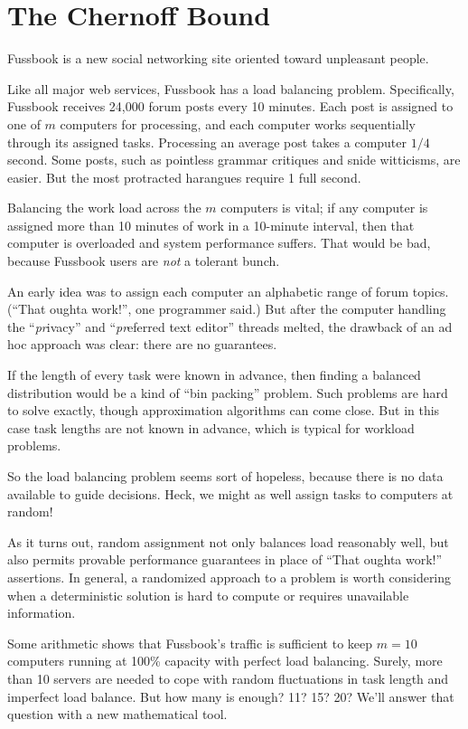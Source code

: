 \chapter{The Chernoff Bound}

Fussbook is a new social networking site oriented toward unpleasant
people.

Like all major web services, Fussbook has a load balancing problem.
Specifically, Fussbook receives 24,000 forum posts every 10 minutes.
Each post is assigned to one of $m$ computers for processing, and each
computer works sequentially through its assigned tasks.  Processing an
average post takes a computer $1/4$ second.  Some posts, such as
pointless grammar critiques and snide witticisms, are easier.  But the
most protracted harangues require 1 full second.

Balancing the work load across the $m$ computers is vital; if any
computer is assigned more than 10 minutes of work in a 10-minute
interval, then that computer is overloaded and system performance
suffers.  That would be bad, because Fussbook users are {\em not} a
tolerant bunch.

An early idea was to assign each computer an alphabetic range of forum
topics.  (``That oughta work!'', one programmer said.)  But after the
computer handling the ``{\em pr}ivacy'' and ``{\em pr}eferred text
editor'' threads melted, the drawback of an ad hoc approach was clear:
there are no guarantees.

If the length of every task were known in advance, then finding a
balanced distribution would be a kind of ``bin packing'' problem.
Such problems are hard to solve exactly, though approximation
algorithms can come close.  But in this case task lengths are not
known in advance, which is typical for workload problems.

So the load balancing problem seems sort of hopeless, because there is
no data available to guide decisions.  Heck, we might as well assign
tasks to computers at random!

As it turns out, random assignment not only balances load reasonably
well, but also permits provable performance guarantees in place of
``That oughta work!''  assertions.  In general, a randomized approach
to a problem is worth considering when a deterministic solution is
hard to compute or requires unavailable information.

Some arithmetic shows that Fussbook's traffic is sufficient to keep $m
= 10$ computers running at 100\% capacity with perfect load balancing.
Surely, more than 10 servers are needed to cope with random
fluctuations in task length and imperfect load balance.  But how many
is enough?  11?  15?  20?  We'll answer that question with a new
mathematical tool.

